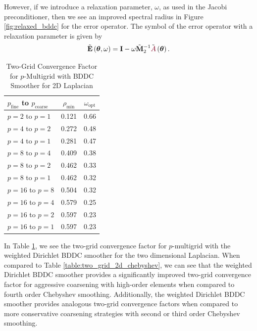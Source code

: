 However, if we introduce a relaxation parameter, $\omega$, as used in the Jacobi preconditioner, then we see an improved spectral radius in Figure \ref{fig:relaxed_bddc} for the error operator.
The symbol of the error operator with a relaxation parameter is given by
\begin{equation}
\tilde{\mathbf{E}} \left( \boldsymbol{\theta}, \omega \right) = \mathbf{I} - \omega \tilde{\mathbf{M}}_2^{-1} \tilde{{\color{burgundy}A}} \left( \boldsymbol{\theta} \right).
\end{equation}

\begin{table}[ht!]
\begin{center}
\begin{tabular}{l cc}
  \toprule
  $p_{\text{fine}}$ to $p_{\text{coarse}}$  & $\rho_{\min}$ & $\omega_{\text{opt}}$  \\
  \toprule
  $p = 2$ to $p = 1$   &  0.121 & 0.66  \\
  \midrule
  $p = 4$ to $p = 2$   &  0.272 & 0.48  \\
  $p = 4$ to $p = 1$   &  0.281 & 0.47  \\
  \midrule
  $p = 8$ to $p = 4$   &  0.409 & 0.38  \\
  $p = 8$ to $p = 2$   &  0.462 & 0.33  \\
  $p = 8$ to $p = 1$   &  0.462 & 0.32  \\
  \midrule
  $p = 16$ to $p = 8$  &  0.504 & 0.32  \\
  $p = 16$ to $p = 4$  &  0.579 & 0.25  \\
  $p = 16$ to $p = 2$  &  0.597 & 0.23  \\
  $p = 16$ to $p = 1$  &  0.597 & 0.23  \\
  \bottomrule
\end{tabular}
\end{center}
\caption{Two-Grid Convergence Factor for $p$-Multigrid with BDDC Smoother for 2D Laplacian}
\label{table:two_grid_bddc_smoother}
\end{table}

In Table \ref{table:two_grid_bddc_smoother}, we see the two-grid convergence factor for $p$-multigrid with the weighted Dirichlet BDDC smoother for the two dimensional Laplacian.
When compared to Table \ref{table:two_grid_2d_chebyshev}, we can see that the weighted Dirichlet BDDC smoother provides a significantly improved two-grid convergence factor for aggressive coarsening with high-order elements when compared to fourth order Chebyshev smoothing.
Additionally, the weighted Dirichlet BDDC smoother provides analogous two-grid convergence factors when compared to more conservative coarsening strategies with second or third order Chebyshev smoothing.

